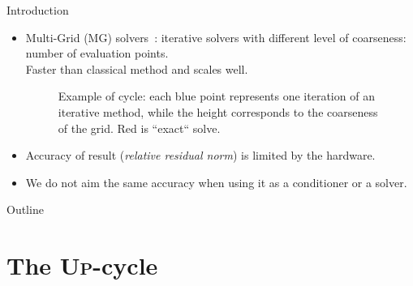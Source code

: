 \documentclass[hyperref={pdfpagelabels=false}]{beamer}
\begin{document}
\begin{frame}{Introduction}
 \begin{itemize}
  \item Multi-Grid (MG) solvers~\cite{Hackbusch1991}: iterative solvers with different level of coarseness: number of evaluation points.\\
  Faster than classical method and scales well.
  \begin{figure}
  \centering
 \caption{Example of cycle: each blue point represents one iteration of an iterative method, while the height corresponds to the coarseness of the grid. Red is ``exact`` solve.}

\end{figure}

\pause

\item Accuracy of result (\textit{relative residual norm}) is limited by the hardware.
\item We do not aim the same accuracy when using it as a conditioner or a solver.
 \end{itemize}

\end{frame}


\begin{frame}{Outline}
 \tableofcontents
\end{frame}

\section{The \textsc{Up}-cycle}
\end{document}
